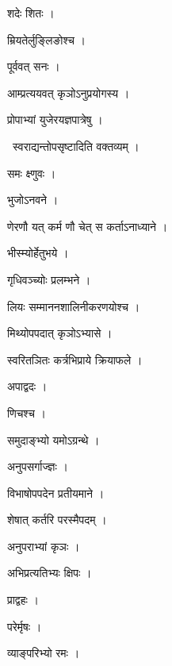 \documentclass[10pt, openany, oneside]{book}
\begin{document}
\noindent शदेः शितः ।

\noindent म्रियतेर्लुङ्लिङोश्च ।

\noindent पूर्ववत् सनः ।

\noindent आम्प्रत्ययवत् कृञोऽनुप्रयोगस्य ।

\noindent प्रोपाभ्यां युजेरयज्ञपात्रेषु ।

\par\noindent\hspace{1.5em}{\vps वा॰}~{\qt स्वराद्यन्तोपसृष्टादिति वक्तव्यम् ।}

\noindent समः क्ष्णुवः ।

\noindent भुजोऽनवने ।

\noindent णेरणौ यत् कर्म णौ चेत् स कर्ताऽनाध्याने ।

\noindent भीस्म्योर्हेतुभये ।

\noindent गृधिवञ्च्योः प्रलम्भने ।

\noindent लियः सम्माननशालिनीकरणयोश्च ।

\noindent मिथ्योपपदात् कृञोऽभ्यासे ।

\noindent स्वरितञितः कर्त्रभिप्राये क्रियाफले ।

\noindent अपाद्वदः ।

\noindent णिचश्च ।

\noindent समुदाङ्भ्यो यमोऽग्रन्थे ।

\noindent अनुपसर्गाज्ज्ञः ।

\noindent विभाषोपपदेन प्रतीयमाने ।

\noindent शेषात् कर्तरि परस्मैपदम् ।

\noindent अनुपराभ्यां कृञः ।

\noindent अभिप्रत्यतिभ्यः क्षिपः ।

\noindent प्राद्वहः ।

\noindent परेर्मृषः ।

\noindent व्याङ्परिभ्यो रमः ।
\end{document}
